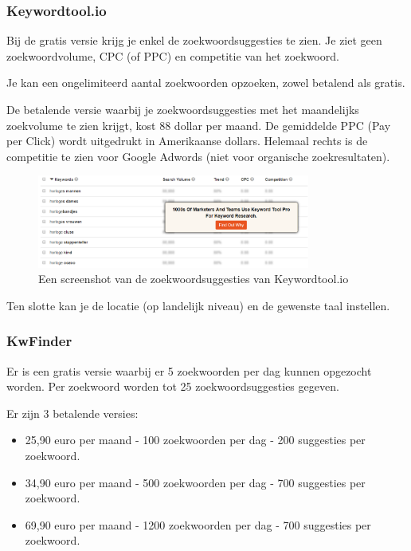 \newpage
\subsubsection{Keywordtool.io}
\label{ch: Keywordtool.io}

Bij de gratis versie krijg je enkel de zoekwoordsuggesties te zien. Je ziet geen zoekwoordvolume, CPC (of PPC) en competitie van het zoekwoord. 

Je kan een ongelimiteerd aantal zoekwoorden opzoeken, zowel betalend als gratis. 

De betalende versie waarbij je zoekwoordsuggesties met het maandelijks zoekvolume te zien krijgt, kost 88 dollar per maand. De gemiddelde PPC (Pay per Click) wordt uitgedrukt in Amerikaanse dollars. Helemaal rechts is de competitie te zien voor Google Adwords (niet voor organische zoekresultaten). 

\begin{figure}[h!]
\centering
\includegraphics[width=0.8\textwidth]{img/keywordtoolio.PNG}
\caption{Een screenshot van de zoekwoordsuggesties van Keywordtool.io \autocite{keywordtoolio}}
\end{figure}

Ten slotte kan je de locatie (op landelijk niveau) en de gewenste taal instellen.

\newpage
\subsubsection{KwFinder}
\label{ch: KwFinder}

Er is een gratis versie waarbij er 5 zoekwoorden per dag kunnen opgezocht worden. Per zoekwoord worden tot 25 zoekwoordsuggesties gegeven. 

Er zijn 3 betalende versies: 

\begin{itemize}
\item 25,90 euro per maand - 100 zoekwoorden per dag - 200 suggesties per zoekwoord.
\item 34,90 euro per maand - 500 zoekwoorden per dag - 700 suggesties per zoekwoord.
\item 69,90 euro per maand - 1200 zoekwoorden per dag - 700 suggesties per zoekwoord.
\end{itemize}


